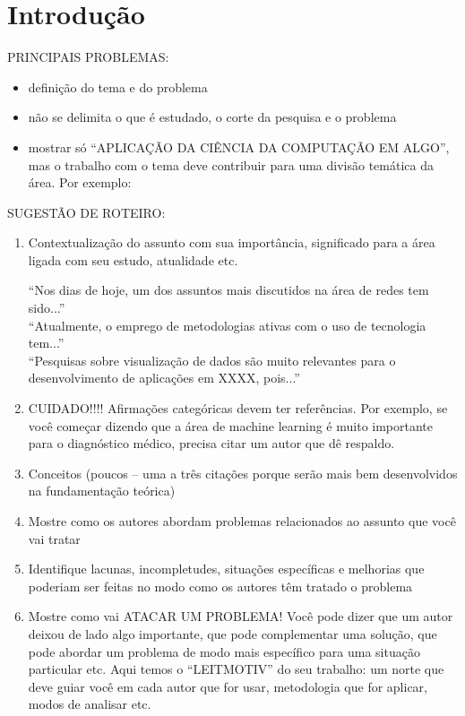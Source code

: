 \chapter[Introdução]{Introdução}
\label{cap:intro}

PRINCIPAIS PROBLEMAS:

\begin{itemize}
    \item definição do tema e do problema
    \item não se delimita o que é estudado, o corte da pesquisa e o problema
    \item mostrar só “APLICAÇÃO DA CIÊNCIA DA COMPUTAÇÃO EM ALGO”, mas o trabalho com o tema deve contribuir para uma divisão temática da área. Por exemplo:
\end{itemize}

SUGESTÃO DE ROTEIRO:
\begin{enumerate}
    \item Contextualização do assunto com sua importância, significado para a área ligada com seu estudo, atualidade etc.

          “Nos dias de hoje, um dos assuntos mais discutidos na área de redes tem sido...”\\“Atualmente, o emprego de metodologias ativas com o uso de tecnologia tem...”\\ “Pesquisas sobre visualização de dados são muito relevantes para o desenvolvimento de aplicações em XXXX, pois...”

    \item CUIDADO!!!! Afirmações categóricas devem ter referências. Por exemplo, se você começar dizendo que a área de machine learning é muito importante para o diagnóstico médico, precisa citar um autor que dê respaldo.

    \item Conceitos (poucos – uma a três citações porque serão mais bem desenvolvidos na fundamentação teórica)

    \item Mostre como os autores abordam problemas relacionados ao assunto que você vai tratar

    \item Identifique lacunas, incompletudes, situações específicas e melhorias que poderiam ser feitas no modo como os autores têm tratado o problema

    \item Mostre como vai ATACAR UM PROBLEMA! Você pode dizer que um autor deixou de lado algo importante, que pode complementar uma solução, que pode abordar um problema de modo mais específico para uma situação particular etc. Aqui temos o “LEITMOTIV” do seu trabalho: um norte que deve guiar você em cada autor que for usar, metodologia que for aplicar, modos de analisar etc.

\end{enumerate}


